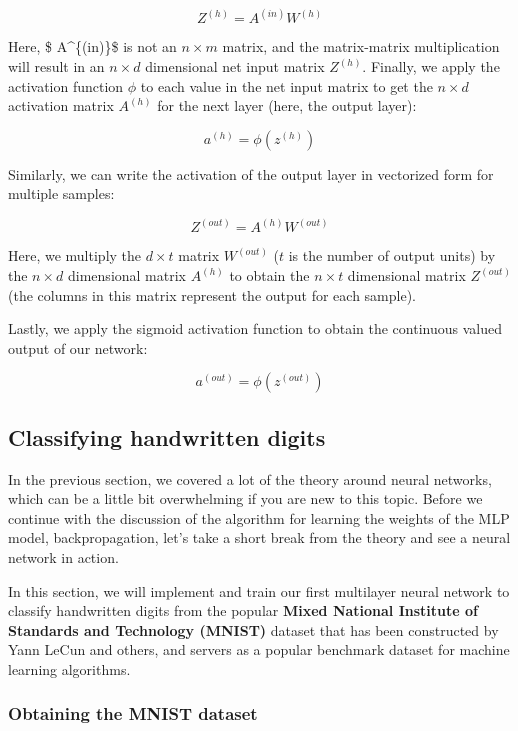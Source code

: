 \documentclass[11pt]{article}
\begin{document}
\[Z^{(h)} = A^{(in)}W^{(h)}\]

Here, \$ A\^{}\{(in)\}\$ is not an \(n \times m\) matrix, and the
matrix-matrix multiplication will result in an \(n \times d\)
dimensional net input matrix \(Z^{(h)}\). Finally, we apply the
activation function \(\phi\) to each value in the net input matrix to
get the \(n \times d\) activation matrix \(A^{(h)}\) for the next layer
(here, the output layer):

\[a^{(h)} = \phi(z^{(h)})\]

Similarly, we can write the activation of the output layer in vectorized
form for multiple samples:

\[Z^{(out)} = A^{(h)}W^{(out)}\]

Here, we multiply the \(d \times t\) matrix \(W^{(out)}\) (\(t\) is the
number of output units) by the \(n \times d\) dimensional matrix
\(A^{(h)}\) to obtain the \(n \times t\) dimensional matrix
\(Z^{(out)}\) (the columns in this matrix represent the output for each
sample).

Lastly, we apply the sigmoid activation function to obtain the
continuous valued output of our network:

\[a^{(out)} = \phi(z^{(out)})\]

    \subsection{Classifying handwritten
digits}\label{classifying-handwritten-digits}

    In the previous section, we covered a lot of the theory around neural
networks, which can be a little bit overwhelming if you are new to this
topic. Before we continue with the discussion of the algorithm for
learning the weights of the MLP model, backpropagation, let's take a
short break from the theory and see a neural network in action.

In this section, we will implement and train our first multilayer neural
network to classify handwritten digits from the popular \textbf{Mixed
National Institute of Standards and Technology (MNIST)} dataset that has
been constructed by Yann LeCun and others, and servers as a popular
benchmark dataset for machine learning algorithms.

    \subsubsection{Obtaining the MNIST
dataset}\label{obtaining-the-mnist-dataset}
\end{document}
